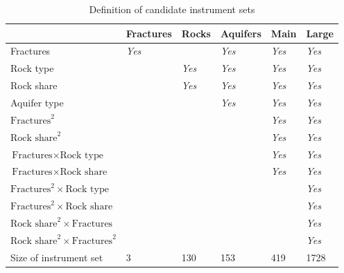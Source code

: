 \begin{table}[htbp]\centering
	\caption{Definition of candidate instrument sets\label{tab:instruments}}
		\begin{tabular}{p{4cm}p{1.5cm}p{1.5cm}p{1.5cm} p{1.5cm} p{1.5cm}}
			\toprule
			& Fractures         & Rocks         & Aquifers     & Main         & Large        \\ \midrule
			Fractures                                       & \emph{Yes} &              & \emph{Yes} & \emph{Yes} & \emph{Yes} \\ 
			Rock type                                       &              & \emph{Yes} & \emph{Yes} & \emph{Yes} & \emph{Yes} \\ 
			Rock share                                      &              & \emph{Yes} & \emph{Yes} & \emph{Yes} & \emph{Yes} \\
			Aquifer type                                    &              &              & \emph{Yes} & \emph{Yes} & \emph{Yes} \\
			$\text{Fractures}^2$                            &              &              &              & \emph{Yes} & \emph{Yes} \\
			$\text{Rock share}^2$                           &              &              &              & \emph{Yes} & \emph{Yes} \\
			$\text{Fractures} \times \text{Rock type}$      &              &              &              & \emph{Yes} & \emph{Yes} \\
			$\text{Fractures} \times \text{Rock share}$     &              &              &              & \emph{Yes} & \emph{Yes} \\
			$\text{Fractures}^2 \times \text{Rock type}$    &              &              &              &              & \emph{Yes} \\
			$\text{Fractures}^2 \times \text{Rock share}$   &              &              &              &              & \emph{Yes} \\
			$\text{Rock share}^2 \times \text{Fractures}$   &              &              &              &              & \emph{Yes} \\
			$\text{Rock share}^2 \times \text{Fractures}^2$ &              &              &              &              & \emph{Yes} \\ \midrule
			Size of instrument set &3 &130 &153 &419 &1728 \\ \bottomrule

\end{tabular}
\end{table}
